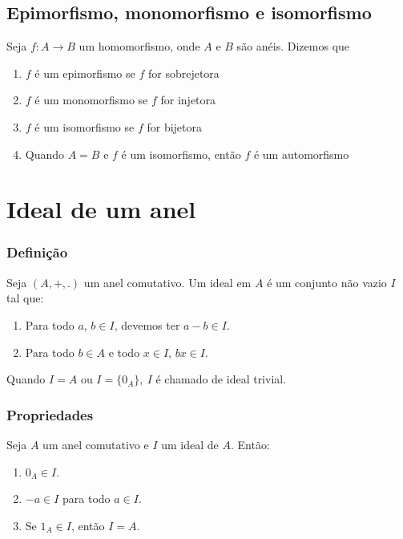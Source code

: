 \subsection{Epimorfismo, monomorfismo e isomorfismo}
\begin{definicao} Seja $f:A\rightarrow B$ um homomorfismo, onde $A$ e $B$ s{\~a}o an{\'e}is. Dizemos que
\begin{enumerate}
\item $f$ {\'e} um epimorfismo se $f$ for sobrejetora
\item $f$ {\'e} um monomorfismo se $f$ for injetora
\item $f$ {\'e} um isomorfismo se $f$ for bijetora
\item Quando $A=B$ e $f$ {\'e} um isomorfismo, ent{\~a}o $f$ {\'e} um automorfismo
\end{enumerate}
\end{definicao}

\section{Ideal de um anel}
\subsubsection{Defini{\c c}{\~a}o}
\begin{definicao} Seja $(A,+,.)$ um anel comutativo. Um ideal em $A$ {\'e} um conjunto n{\~a}o vazio $I$ tal que:
\begin{enumerate}
\item Para todo $a$, $b\in I$, devemos ter $a - b \in I$.
\item Para todo $b\in A$ e todo $x \in I$, $bx \in I$.
\end{enumerate}
\end{definicao}

Quando $I=A$ ou $I=\{0_{A}\},\ I$ {\'e} chamado de ideal trivial.

\subsubsection{Propriedades}
\begin{proposicao} Seja $A$ um anel comutativo e $I$ um ideal de $A$. Ent{\~a}o:
\begin{enumerate}
 	\item $0_{A}\in I$.
 	\item $-a \in I$ para todo $a \in I$.
 	\item Se $1_A \in I$, ent\~ao $I = A$.
 \end{enumerate}
\end{proposicao}

